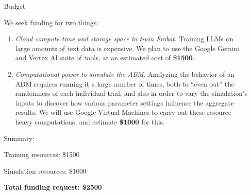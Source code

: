 \documentclass[12pt]{beamer}
\begin{document}
\begin{frame}[c]{Budget}

\small
We seek funding for two things:

\begin{enumerate}
\itemsep.5em
\footnotesize
\item \textsl{Cloud compute time and storage space to train Frobot.} Training LLMs on large amounts of text data is expensive. We plan to use the Google Gemini and Vertex AI suite of tools, at an estimated cost of \textbf{\$1500}.

\item \textsl{Computational power to simulate the ABM.} Analyzing the behavior of an ABM requires running it a large number of times, both to ``even out'' the randomness of each individual trial, and also in order to vary the simulation's inputs to discover how various parameter settings influence the aggregate results. We will use Google Virtual Machines to carry out these resource-heavy computations, and estimate \textbf{\$1000} for this.

\end{enumerate}

\normalsize
Summary:
\begin{compactenum}
\item Training resources: \$1500
\item Simulation resources: \$1000
\end{compactenum}
\begin{compactitem}
\item \textbf{Total funding request: \$2500}
\end{compactitem}

\end{frame}
\end{document}
